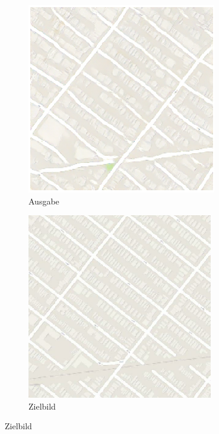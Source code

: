 \begin{figure}[ht]
\begin{subfigure}[t]{.14\textwidth}
	\end{subfigure}
	\begin{subfigure}[t]{.14\textwidth}
		\centering
		\caption*{Ausgabe}
		\includegraphics[width=\linewidth]{images/Pix2PixResults/Generiertes-Bild2.png}
	\end{subfigure}
	\begin{subfigure}[t]{.14\textwidth}
		\centering
		\caption*{Zielbild}
		\includegraphics[width=\linewidth]{images/Pix2PixResults/Ziel-Bild2.png}
	\end{subfigure}
\end{figure}

